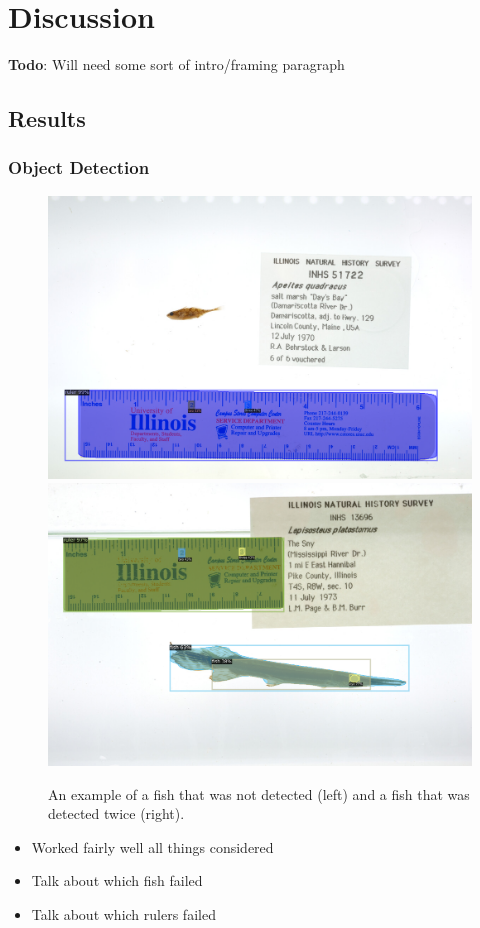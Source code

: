 \documentclass[screen,review]{acmart}
\begin{document}
\section{Discussion}
\textbf{Todo}: Will need some sort of intro/framing paragraph
\subsection{Results}
\subsubsection{Object Detection}
\begin{figure}[H]
  \centering
  \includegraphics[width=0.49\linewidth]{images/none1}
  \includegraphics[width=0.49\linewidth]{images/double1}
  \caption{An example of a fish that was not detected (left) and a fish that was detected twice (right).}
\end{figure}

\begin{itemize}
    \item Worked fairly well all things considered
    \item Talk about which fish failed
    \item Talk about which rulers failed
\end{itemize}
\end{document}
